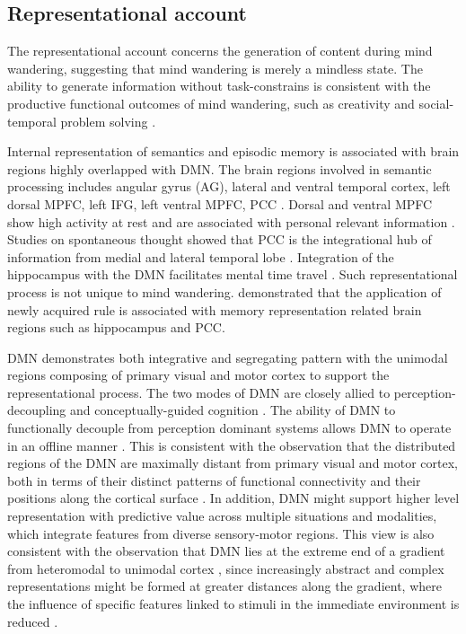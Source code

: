 \subsection{Representational account}

The representational account concerns the generation of content during mind wandering, suggesting that mind wandering is merely a mindless state. The ability to generate information without task-constrains is consistent with the productive functional outcomes of mind wandering, such as creativity \cite{Baird2012,Smeekens2016} and social-temporal problem solving \cite{RubyPlos2013,PoerioFrontiers2016,Medea2016}. 

Internal representation of semantics and episodic memory is associated with brain regions highly overlapped with DMN. The brain regions involved in semantic processing includes angular gyrus (AG), lateral and ventral temporal cortex, left dorsal MPFC, left IFG, left ventral MPFC, PCC \cite<see meta-analysis from >{Binder2009}. Dorsal and ventral MPFC show high activity at rest and are associated with personal relevant information \cite{Gusnard2001}. Studies on spontaneous thought showed that PCC is the integrational hub of information from medial and lateral temporal lobe \cite{Smallwood2016}. Integration of the hippocampus with the DMN facilitates mental time travel \cite{Karapanagiotidis2017}. Such representational process is not unique to mind wandering.  demonstrated that the application of newly acquired rule is associated with memory representation related brain regions such as hippocampus and PCC. 

DMN demonstrates both integrative and segregating pattern with the unimodal regions composing of primary visual and motor cortex to support the representational process. The two modes of DMN are closely allied to perception-decoupling and conceptually-guided cognition \cite{Murphy2018}. The ability of DMN to functionally decouple from perception dominant systems allows DMN to operate in an offline manner \cite{Smallwood2013}. This is consistent with the observation that the distributed regions of the DMN are maximally distant from primary visual and motor cortex, both in terms of their distinct patterns of functional connectivity and their positions along the cortical surface \cite{Margulies2016}. In addition, DMN might support higher level representation with predictive value across multiple situations and modalities, which integrate features from diverse sensory-motor regions. This view is also consistent with the observation that DMN lies at the extreme end of a gradient from heteromodal to unimodal cortex \cite{Margulies2016}, since increasingly abstract and complex representations might be formed at greater distances along the gradient, where the influence of specific features linked to stimuli in the immediate environment is reduced \cite{Mesulam1998,Buckner2013, Margulies2016}.

